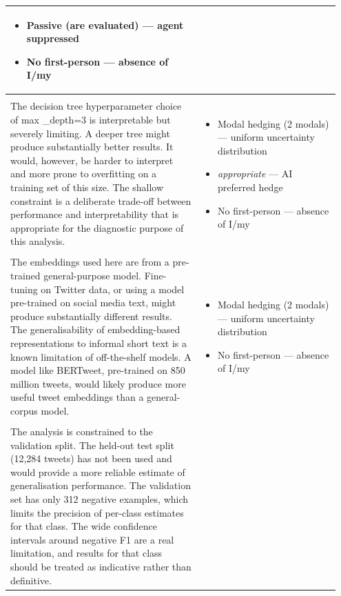 \documentclass[11pt]{article}
\begin{document}
\begin{longtable}{|p{0.55\linewidth}|p{0.40\linewidth}|}
\begin{itemize}[leftmargin=1em,itemsep=1pt,topsep=1pt,parsep=0pt]
  \item Passive (are evaluated) --- agent suppressed
  \item No first-person --- absence of I/my
\end{itemize} \\[2pt]
\hline
\rule{0pt}{3.5cm} & \\
\hline
The decision tree hyperparameter choice of max \_depth=3 is interpretable but severely limiting. A deeper tree might produce substantially better results. It would, however, be harder to interpret and more prone to overfitting on a training set of this size. The shallow constraint is a deliberate trade-off between performance and interpretability that is appropriate for the diagnostic purpose of this analysis. & \begin{itemize}[leftmargin=1em,itemsep=1pt,topsep=1pt,parsep=0pt]
  \item Modal hedging (2 modals) --- uniform uncertainty distribution
  \item \textit{appropriate} --- AI preferred hedge
  \item No first-person --- absence of I/my
\end{itemize} \\[2pt]
\hline
\rule{0pt}{3.5cm} & \\
\hline
The embeddings used here are from a pre-trained general-purpose model. Fine-tuning on Twitter data, or using a model pre-trained on social media text, might produce substantially different results. The generalisability of embedding-based representations to informal short text is a known limitation of off-the-shelf models. A model like BERTweet, pre-trained on 850 million tweets, would likely produce more useful tweet embeddings than a general-corpus model. & \begin{itemize}[leftmargin=1em,itemsep=1pt,topsep=1pt,parsep=0pt]
  \item Modal hedging (2 modals) --- uniform uncertainty distribution
  \item No first-person --- absence of I/my
\end{itemize} \\[2pt]
\hline
\rule{0pt}{3.5cm} & \\
\hline
The analysis is constrained to the validation split. The held-out test split (12,284 tweets) has not been used and would provide a more reliable estimate of generalisation performance. The validation set has only 312 negative examples, which limits the precision of per-class estimates for that class. The wide confidence intervals around negative F1 are a real limitation, and results for that class should be treated as indicative rather than definitive. & \begin{itemize}[leftmargin=1em,itemsep=1pt,topsep=1pt,parsep=0pt]

\end{itemize}
\end{longtable}
\end{document}
